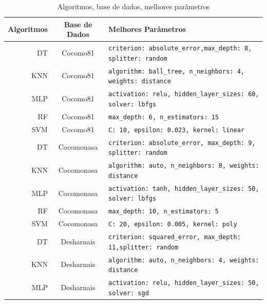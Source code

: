 \documentclass[12pt]{article}
\begin{document}
\begin{table}[h!]
  \begin{center}
    \caption{Algoritmos, base de dados, melhores parâmetros}
    \label{tab_parametros}
    \begin{tabular}{r|c|l}
      \textbf{Algoritmos} & \textbf{Base de Dados} & \textbf{ Melhores Parâmetros}        \\
      \hline
      DT                  & Cocomo81               & \scriptsize{\verb=criterion: absolute_error,max_depth: 8, splitter: random=}  \\ \hline
      KNN                 & Cocomo81               & \scriptsize{\verb=algorithm: ball_tree, n_neighbors: 4, weights: distance=}  \\ \hline
      MLP                 & Cocomo81               & \scriptsize{\verb=activation: relu, hidden_layer_sizes: 60, solver: lbfgs=}  \\ \hline
      RF                  & Cocomo81               & \scriptsize{\verb=max_depth: 6, n_estimators: 15=}  \\ \hline
      SVM                 & Cocomo81               & \scriptsize{\verb=C: 10, epsilon: 0.023, kernel: linear=}  \\ \hline
      DT                  & Cocomonasa             & \scriptsize{\verb=criterion: absolute_error, max_depth: 9, splitter: random=}  \\ \hline
      KNN                 & Cocomonasa             & \scriptsize{\verb=algorithm: auto, n_neighbors: 8, weights: distance=}  \\ \hline
      MLP                 & Cocomonasa             & \scriptsize{\verb=activation: tanh, hidden_layer_sizes: 50, solver: lbfgs=}  \\ \hline
      RF                  & Cocomonasa             & \scriptsize{\verb=max_depth: 10, n_estimators: 5=}  \\ \hline
      SVM                 & Cocomonasa             & \scriptsize{\verb=C: 20, epsilon: 0.005, kernel: poly=} \\ \hline
      DT                  & Desharnais             & \scriptsize{\verb=criterion: squared_error, max_depth: 11,splitter: random=} \\ \hline
      KNN                 & Desharnais             & \scriptsize{\verb=algorithm: auto, n_neighbors: 4, weights: distance=} \\ \hline
      MLP                 & Desharnais             & \scriptsize{\verb=activation: relu, hidden_layer_sizes: 50,  solver: sgd=} \\ \hline

\end{tabular}
\end{center}
\end{table}
\end{document}

